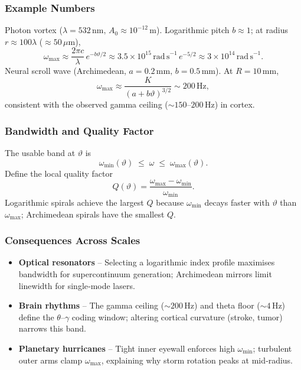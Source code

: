 \medskip
\subsubsection{Example Numbers}

Photon vortex (\(\lambda=532\,\mathrm{nm},\,A_{0}\approx10^{-12}\,\mathrm{m}\)).  Logarithmic pitch \(b\approx1\); at radius \(r\approx100\lambda\) (\(\approx50\,\mu\mathrm{m}\)),
\[
  \omega_{\max}
  \approx \frac{2\pi c}{\lambda}\,e^{-b\vartheta/2}
  \approx 3.5\times10^{15}\,\mathrm{rad\,s}^{-1}\,e^{-5/2}
  \approx3\times10^{14}\,\mathrm{rad\,s}^{-1}.
\]
Neural scroll wave (Archimedean, \(a=0.2\,\mathrm{mm},\,b=0.5\,\mathrm{mm}\)).  At \(R=10\,\mathrm{mm}\),
\[
  \omega_{\max}\approx \frac{K}{(a+b\vartheta)^{3/2}}
  \sim200\,\mathrm{Hz},
\]
consistent with the observed gamma ceiling (\(\sim150\text{–}200\,\mathrm{Hz}\)) in cortex.

\medskip
\subsubsection{Bandwidth and Quality Factor}

The usable band at \(\vartheta\) is
\[
  \omega_{\min}(\vartheta)\;\le\;\omega\;\le\;\omega_{\max}(\vartheta).
\]
Define the local quality factor
\[
  Q(\vartheta)
  = \frac{\omega_{\max}-\omega_{\min}}{\omega_{\min}}.
\]
Logarithmic spirals achieve the largest \(Q\) because \(\omega_{\min}\) decays faster with \(\vartheta\) than \(\omega_{\max}\); Archimedean spirals have the smallest \(Q\).

\medskip
\subsubsection{Consequences Across Scales}

\begin{itemize}
  \item \textbf{Optical resonators} – Selecting a logarithmic index profile maximises bandwidth for supercontinuum generation; Archimedean mirrors limit linewidth for single‐mode lasers.
  \item \textbf{Brain rhythms} – The gamma ceiling (\(\sim200\,\mathrm{Hz}\)) and theta floor (\(\sim4\,\mathrm{Hz}\)) define the \(\theta\)–\(\gamma\) coding window; altering cortical curvature (stroke, tumor) narrows this band.
  \item \textbf{Planetary hurricanes} – Tight inner eyewall enforces high \(\omega_{\min}\); turbulent outer arms clamp \(\omega_{\max}\), explaining why storm rotation peaks at mid‐radius.
\end{itemize}

